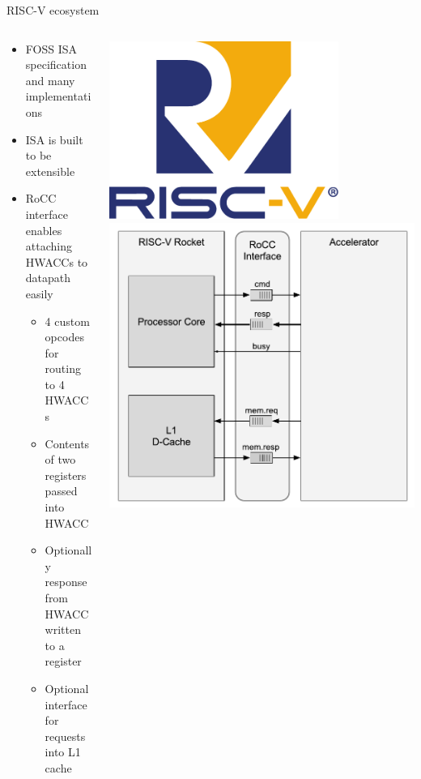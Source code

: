 \documentclass[dvipsnames]{beamer}
\begin{document}
\begin{frame}{RISC-V ecosystem}
  \begin{columns}[T]
    \begin{column}{0.6\textwidth}
      \begin{itemize}
      \item FOSS ISA specification and many implementations
      \item ISA is built to be extensible
      \item RoCC interface enables attaching HWACCs to datapath easily
        \begin{itemize}
        \item 4 custom opcodes for routing to 4 HWACCs
        \item Contents of two registers passed into HWACC
        \item Optionally response from HWACC written to a register
        \item Optional interface for requests into L1 cache
        \end{itemize}
      \end{itemize}
    \end{column}
    \hfill
    \begin{column}{0.4\textwidth}
      \centering
      \includegraphics[width=0.75\textwidth]{media/Tall_2.pdf}
      \includegraphics[width=1.0\textwidth]{media/rocc.pdf}

\end{column}
\end{columns}
\end{frame}
\end{document}
